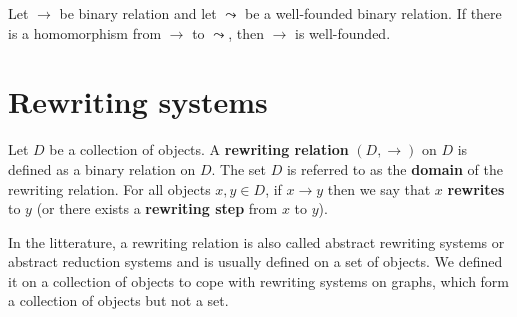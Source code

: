 \begin{proposition}
  \label{prop:binary_relation:proving_well_foundedness}
  Let \(\to\) be binary relation and let $\leadsto$ be a well-founded binary relation. If there is a homomorphism from \(\to\) to \(\leadsto\), then \(\to\) is well-founded.
\end{proposition}
  

\chapter{Rewriting systems}
    \label{sec:category_of_rewriting_systems}      
      \begin{definition}
        \label{def:ars}
        Let $D$ be a collection of objects.  
        A \textbf{rewriting relation} $(D, \rightarrow)$ on $D$ is defined as a binary relation on $D$.  
        The set $D$ is referred to as the \textbf{domain} of the rewriting relation.  
        For all objects $x, y \mathop{\in} D$, if $x \mathop{\rightarrow} y$ then we say that $x$ \textbf{rewrites} to $y$ (or there exists a \textbf{rewriting step} from $x$ to $y$).
    \end{definition}

      In the litterature, a rewriting relation is also called abstract rewriting systems or abstract reduction systems \cite{nipkow1998term,terese2003term} and is usually defined on a set of objects. We defined it on a collection of objects to cope with rewriting systems on graphs, which form a collection of objects but not a set.
       
